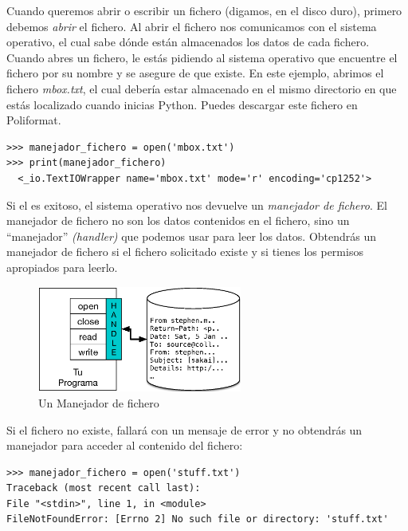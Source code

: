   

Cuando queremos abrir o escribir un fichero (digamos, en el disco duro),
primero debemos \emph{abrir} el fichero. Al abrir el fichero nos
comunicamos con el sistema operativo, el cual sabe dónde están
almacenados los datos de cada fichero. Cuando abres un fichero, le estás
pidiendo al sistema operativo que encuentre el fichero por su nombre y
se asegure de que existe. En este ejemplo, abrimos el fichero
\emph{mbox.txt}, el cual debería estar almacenado en el mismo directorio
en que estás localizado cuando inicias Python. Puedes descargar este
fichero en Poliformat.

\begin{Verbatim}[frame=single]
>>> manejador_fichero = open('mbox.txt')
>>> print(manejador_fichero)
  <_io.TextIOWrapper name='mbox.txt' mode='r' encoding='cp1252'>
\end{Verbatim}


Si el  es exitoso, el sistema operativo nos devuelve un
\emph{manejador de fichero}. El manejador de fichero no son los datos
contenidos en el fichero, sino un ``manejador'' \emph{(handler)} que
podemos usar para leer los datos. Obtendrás un manejador de fichero si
el fichero solicitado existe y si tienes los permisos apropiados para
leerlo.

\begin{figure}
\centering
\includegraphics[width=0.6\textwidth]{images/handle.eps}
\caption{Un Manejador de fichero}
\end{figure}

Si el fichero no existe,  fallará con un mensaje de error y
no obtendrás un manejador para acceder al contenido del fichero:

\begin{Verbatim}[frame=single]
>>> manejador_fichero = open('stuff.txt')
Traceback (most recent call last):
File "<stdin>", line 1, in <module>
FileNotFoundError: [Errno 2] No such file or directory: 'stuff.txt'
\end{Verbatim}

